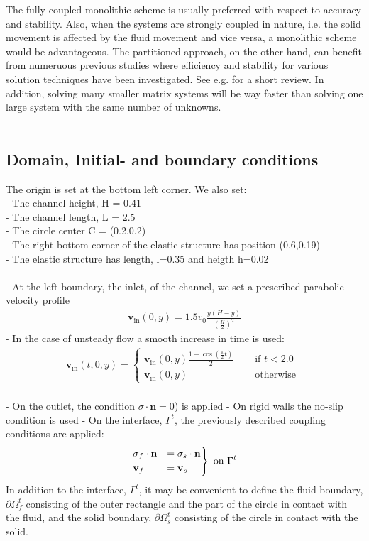 The fully coupled monolithic scheme is usually preferred with respect to accuracy and stability. Also, when the systems are strongly coupled in nature, i.e. the solid movement is affected by the fluid movement and vice versa, a monolithic scheme would be advantageous. The partitioned approach, on the other hand, can benefit from numeruous previous studies where efficiency and stability for various solution techniques have been investigated. See e.g. \cite{Tang14} for a short review. In addition, solving many smaller matrix systems will be way faster than solving one large system with the same number of unknowns.
\\
\\
\subsection{Domain, Initial- and boundary conditions}
The origin is set at the bottom left corner. We also set:
\\ - The channel height, H = 0.41
\\ - The channel length, L = 2.5
\\ - The circle center C = (0.2,0.2)
\\ - The right bottom corner of the elastic structure has position (0.6,0.19) 
\\ - The elastic structure has length, l=0.35 and heigth h=0.02
\\
\\
- At the left boundary, the inlet, of the channel, we set a prescribed parabolic velocity profile
\begin{align}
\mathbf{v}_{\text{in}}(0,y) = 1.5\bar{v_0}\frac{y(H-y)}{(\frac{H}{2})^2}
\end{align}
- In the case of unsteady flow a smooth increase in time is used:
\begin{align}
 \mathbf{v}_{\text{in}}(t,0,y)= \begin{cases}
				\mathbf{v}_{\text{in}}(0,y)\frac{1-\cos(\frac{\pi}{2}t)}{2} & \quad \text{ if } t<2.0 \\
				\mathbf{v}_{\text{in}}(0,y) & \quad  \text{ otherwise }
		 		\end{cases}
\end{align}
\\
- On the outlet, the condition $\sigma \cdot \mathbf{n} = 0$) is applied
- On rigid walls the no-slip condition is used
- On the interface, $\Gamma^t$, the previously described coupling conditions are applied:
\begin{align}
\begin{rcases}
\sigma_f \cdot \mathbf{n} & =  \sigma_s \cdot \mathbf{n} \\
\mathbf{v}_f & = \mathbf{v}_s
\end{rcases}
\text{ on } \Gamma^t
\end{align}
In addition to the interface, $\Gamma^t$, it may be convenient to define the fluid boundary, $\partial \Omega_f^t$ consisting of the outer rectangle and the part of the circle in contact with the fluid, and the solid boundary, $\partial \Omega_s^t$ consisting of the circle in contact with the solid.
